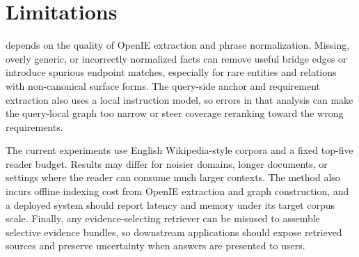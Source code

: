 \section{Limitations}
\label{sec:limitations}

\methodname{} depends on the quality of OpenIE extraction and phrase
normalization. Missing, overly generic, or incorrectly normalized
facts can remove useful bridge edges or introduce spurious endpoint
matches, especially for rare entities and relations with non-canonical
surface forms. The query-side anchor and requirement extraction also
uses a local instruction model, so errors in that analysis can make the
query-local graph too narrow or steer coverage reranking toward the
wrong requirements.

The current experiments use English Wikipedia-style corpora and a
fixed top-five reader budget. Results may differ for noisier domains,
longer documents, or settings where the reader can consume much larger
contexts. The method also incurs offline indexing cost from OpenIE
extraction and graph construction, and a deployed system should report
latency and memory under its target corpus scale. Finally, any
evidence-selecting retriever can be misused to assemble selective
evidence bundles, so downstream applications should expose retrieved
sources and preserve uncertainty when answers are presented to users.
